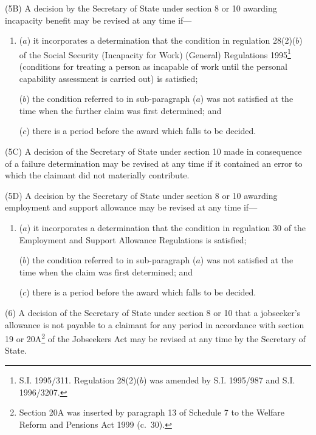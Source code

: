 \documentclass[12pt,a4paper]{article}
\begin{document}
(5B) A decision by the Secretary of State under section 8 or 10 awarding incapacity benefit may be revised at any time if—
\begin{enumerate}\item[]
\begin{sloppypar}
($a$) it incorporates a determination that the condition in regulation 28(2)($b$)  of the Social Security (Incapacity for Work) (General) Regulations 1995\footnote{S.I. 1995/311. Regulation 28(2)($b$) was amended by S.I. 1995/987 and S.I. 1996/3207.} (conditions for treating a person as incapable of work until the personal capability assessment is carried out) is satisfied;
\end{sloppypar}

($b$) the condition referred to in sub-paragraph ($a$)  was not satisfied at the time when the further claim was first determined; and

($c$) there is a period before the award which falls to be decided.
\end{enumerate}

(5C) A decision of the Secretary of State under section 10 made in consequence of a failure determination may be revised at any time if it contained an error to which the claimant did not materially contribute.

(5D) A decision by the Secretary of State under section 8 or 10 awarding employment and support allowance may be revised at any time if—
\begin{enumerate}\item[]
($a$) it incorporates a determination that the condition in regulation 30 of the Employment and Support Allowance Regulations is satisfied;

($b$) the condition referred to in sub-paragraph ($a$)  was not satisfied at the time when the claim was first determined; and

($c$) there is a period before the award which falls to be decided.
\end{enumerate}

(6) A decision of the Secretary of State under section 8 or 10 that a jobseeker’s allowance is not payable to a claimant for any period in accordance with section 19 
or 20A\footnote{Section 20A was inserted by paragraph 13 of Schedule 7 to the Welfare Reform and Pensions Act 1999 (c.\ 30).}  %
of the Jobseekers Act may be revised at any time by the Secretary of State.
\end{document}
